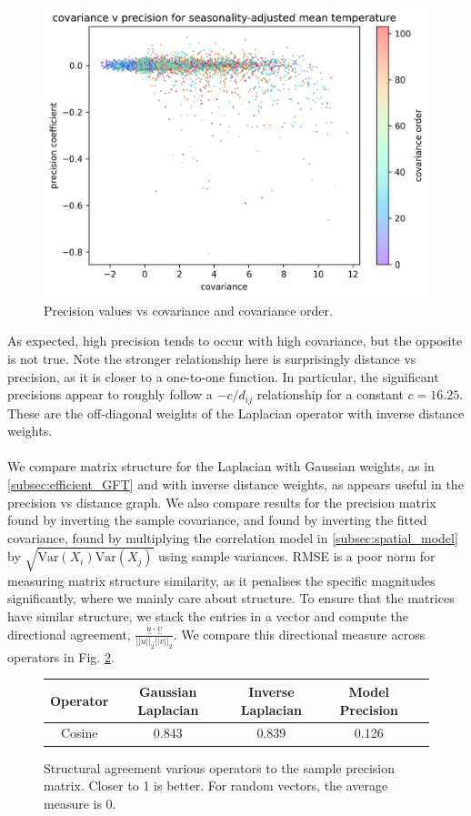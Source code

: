 \documentclass[12pt,a4paper]{article} %
\newcommand{\ve}[1]{\underset{\sim}{#1}}
\begin{document}
\begin{figure}[!ht]
    \centering
    \includegraphics[width=.8\linewidth]{mean_nearest_error_precision_by_cov.png}
    \caption{Precision values vs covariance and covariance order.}
    \label{fig:cov_precision}
\end{figure}
As expected, high precision tends to occur with high covariance, but the opposite is not true. Note the stronger relationship here is surprisingly distance vs precision, as it is closer to a one-to-one function. In particular, the significant precisions appear to roughly follow a $-c/d_{ij}$ relationship for a constant $c=16.25$. These are the off-diagonal weights of the Laplacian operator with inverse distance weights.\\\\
We compare matrix structure for the Laplacian with Gaussian weights, as in \ref{subsec:efficient_GFT} and with inverse distance weights, as appears useful in the precision vs distance graph. We also compare results for the precision matrix found by inverting the sample covariance, and found by inverting the fitted covariance, found by multiplying the correlation model in \ref{subsec:spatial_model} by $\sqrt{\text{Var}(X_i)\text{Var}(X_j)}$ using sample variances. RMSE is a poor norm for measuring matrix structure similarity, as it penalises the specific magnitudes significantly, where we mainly care about structure. To ensure that the matrices have similar structure, we stack the entries in a vector and compute the directional agreement, $\frac{\ve{u}\cdot\ve{v}}{||u||_2||v||_2}$. We compare this directional measure across operators in Fig. \ref{fig:matrix_angle}.
\begin{figure}[!ht]
    \centering
        \begin{tabular}{|c|c|c|c|c|}
         \hline
         Operator & Gaussian Laplacian & Inverse Laplacian & Model Precision \\
         \hline
         Cosine & 0.843 & 0.839 & 0.126 \\
         \hline
    \end{tabular}
    \caption{Structural agreement various operators to the sample precision matrix. Closer to 1 is better. For random vectors, the average measure is 0.}
    \label{fig:matrix_angle}
\end{figure}
\end{document}
